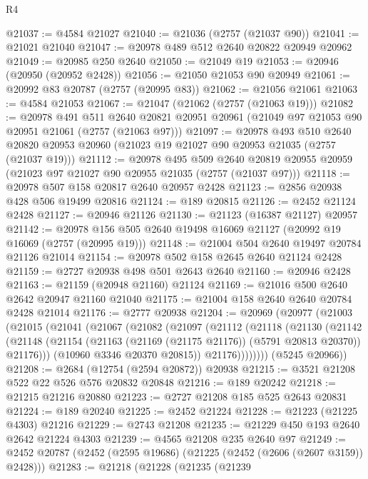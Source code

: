 \begin{lexlean}{R4}
\begin{coremodule}
@21037 := @4584 @21027
@21040 := @21036 (@2757 (@21037 @90))
@21041 := @21021 @21040
@21047 := @20978 @489 @512 @2640 @20822 @20949 @20962
@21049 := @20985 @250 @2640
@21050 := @21049 @19
@21053 := @20946 (@20950 (@20952 @2428))
@21056 := @21050 @21053 @90 @20949
@21061 := @20992 @83 @20787 (@2757 (@20995 @83))
@21062 := @21056 @21061
@21063 := @4584 @21053
@21067 := @21047 (@21062 (@2757 (@21063 @19)))
@21082 := @20978
    @491
    @511
    @2640
    @20821
    @20951
    @20961
    (@21049 @97 @21053 @90 @20951 @21061 (@2757 (@21063 @97)))
@21097 := @20978
    @493
    @510
    @2640
    @20820
    @20953
    @20960
    (@21023 @19 @21027 @90 @20953 @21035 (@2757 (@21037 @19)))
@21112 := @20978
    @495
    @509
    @2640
    @20819
    @20955
    @20959
    (@21023 @97 @21027 @90 @20955 @21035 (@2757 (@21037 @97)))
@21118 := @20978 @507 @158 @20817 @2640 @20957 @2428
@21123 := @2856 @20938 @428 @506 @19499 @20816
@21124 := @189 @20815
@21126 := @2452 @21124 @2428
@21127 := @20946 @21126
@21130 := @21123 (@16387 @21127) @20957
@21142 := @20978 @156 @505 @2640 @19498 @16069 @21127 (@20992 @19 @16069 (@2757 (@20995 @19)))
@21148 := @21004 @504 @2640 @19497 @20784 @21126 @21014
@21154 := @20978 @502 @158 @2645 @2640 @21124 @2428
@21159 := @2727 @20938 @498 @501 @2643 @2640
@21160 := @20946 @2428
@21163 := @21159 (@20948 @21160) @21124
@21169 := @21016 @500 @2640 @2642 @20947 @21160 @21040
@21175 := @21004 @158 @2640 @2640 @20784 @2428 @21014
@21176 := @2777 @20938
@21204 := @20969
    (@20977
      (@21003
        (@21015
          (@21041
            (@21067
              (@21082
                (@21097
                  (@21112
                    (@21118
                      (@21130
                        (@21142
                          (@21148
                            (@21154
                              (@21163 (@21169 (@21175 @21176)) (@5791 @20813 @20370))
                              @21176)))
                        (@10960 @3346 @20370 @20815))
                      @21176))))))))
      (@5245 @20966))
@21208 := @2684 (@12754 (@2594 @20872)) @20938
@21215 := @3521 @21208 @522 @22 @526 @576 @20832 @20848
@21216 := @189 @20242
@21218 := @21215 @21216 @20880
@21223 := @2727 @21208 @185 @525 @2643 @20831
@21224 := @189 @20240
@21225 := @2452 @21224
@21228 := @21223 (@21225 @4303) @21216
@21229 := @2743 @21208
@21235 := @21229 @450 @193 @2640 @2642 @21224 @4303
@21239 := @4565 @21208 @235 @2640 @97
@21249 := @2452 @20787 (@2452 (@2595 @19686) (@21225 (@2452 (@2606 (@2607 @3159)) @2428)))
@21283 := @21218
    (@21228
      (@21235
        (@21239

\end{coremodule}
\end{lexlean}
